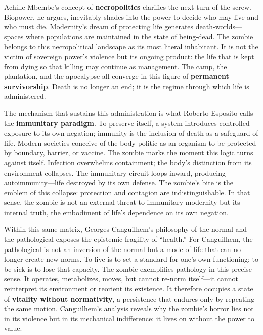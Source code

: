 \documentclass[11pt]{article}
\begin{document}
Achille Mbembe’s concept of \textbf{necropolitics} clarifies the next turn of the screw. Biopower, he argues, inevitably shades into the power to decide who may live and who must die. Modernity’s dream of protecting life generates death-worlds—spaces where populations are maintained in the state of being-dead. The zombie belongs to this necropolitical landscape as its most literal inhabitant. It is not the victim of sovereign power’s violence but its ongoing product: the life that is kept from dying so that killing may continue as management. The camp, the plantation, and the apocalypse all converge in this figure of \textbf{permanent survivorship}. Death is no longer an end; it is the regime through which life is administered.

The mechanism that sustains this administration is what Roberto Esposito calls the \textbf{immunitary paradigm}. To preserve itself, a system introduces controlled exposure to its own negation; immunity is the inclusion of death as a safeguard of life. Modern societies conceive of the body politic as an organism to be protected by boundary, barrier, or vaccine. The zombie marks the moment this logic turns against itself. Infection overwhelms containment; the body’s distinction from its environment collapses. The immunitary circuit loops inward, producing autoimmunity—life destroyed by its own defense. The zombie’s bite is the emblem of this collapse: protection and contagion are indistinguishable. In that sense, the zombie is not an external threat to immunitary modernity but its internal truth, the embodiment of life’s dependence on its own negation.

Within this same matrix, Georges Canguilhem’s philosophy of the normal and the pathological exposes the epistemic fragility of “health.” For Canguilhem, the pathological is not an inversion of the normal but a mode of life that can no longer create new norms. To live is to set a standard for one’s own functioning; to be sick is to lose that capacity. The zombie exemplifies pathology in this precise sense. It operates, metabolizes, moves, but cannot re-norm itself—it cannot reinterpret its environment or reorient its existence. It therefore occupies a state of \textbf{vitality without normativity}, a persistence that endures only by repeating the same motion. Canguilhem’s analysis reveals why the zombie’s horror lies not in its violence but in its mechanical indifference: it lives on without the power to value.
\end{document}
